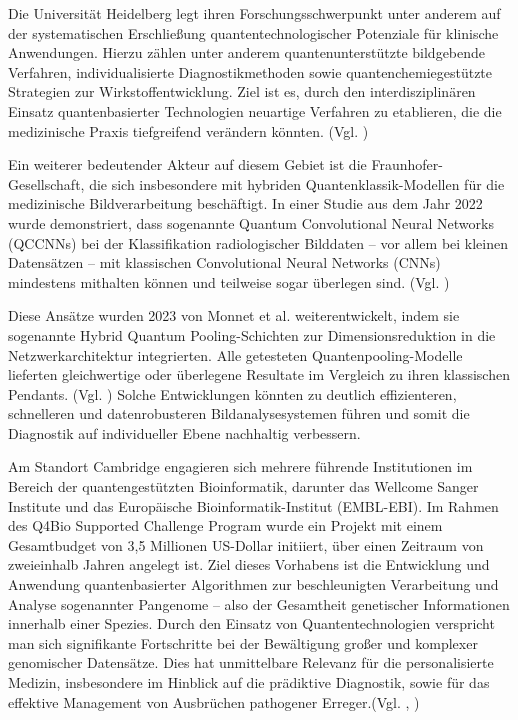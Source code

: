 Die Universität Heidelberg legt ihren Forschungsschwerpunkt unter anderem auf der systematischen Erschließung quantentechnologischer Potenziale für klinische Anwendungen. Hierzu zählen unter anderem quantenunterstützte bildgebende Verfahren, individualisierte Diagnostikmethoden sowie quantenchemiegestützte Strategien zur Wirkstoffentwicklung. Ziel ist es, durch den interdisziplinären Einsatz quantenbasierter Technologien neuartige Verfahren zu etablieren, die die medizinische Praxis tiefgreifend verändern könnten. (Vgl. \cite{noauthor_hgsfp_nodate})

Ein weiterer bedeutender Akteur auf diesem Gebiet ist die Fraunhofer-Gesellschaft, die sich insbesondere mit hybriden Quantenklassik-Modellen für die medizinische Bildverarbeitung beschäftigt. In einer Studie aus dem Jahr 2022 wurde demonstriert, dass sogenannte Quantum Convolutional Neural Networks (QCCNNs) bei der Klassifikation radiologischer Bilddaten – vor allem bei kleinen Datensätzen – mit klassischen Convolutional Neural Networks (CNNs) mindestens mithalten können und teilweise sogar überlegen sind. (Vgl. \cite{matic_quantum-classical_2022})

Diese Ansätze wurden 2023 von Monnet et al. weiterentwickelt, indem sie sogenannte Hybrid Quantum Pooling-Schichten zur Dimensionsreduktion in die Netzwerkarchitektur integrierten. Alle getesteten Quantenpooling-Modelle lieferten gleichwertige oder überlegene Resultate im Vergleich zu ihren klassischen Pendants. (Vgl. \cite{monnet_pooling_2023}) 
 Solche Entwicklungen könnten zu deutlich effizienteren, schnelleren und datenrobusteren Bildanalysesystemen führen und somit die Diagnostik auf individueller Ebene nachhaltig verbessern.

Am Standort Cambridge engagieren sich mehrere führende Institutionen im Bereich der quantengestützten Bioinformatik, darunter das Wellcome Sanger Institute und das Europäische Bioinformatik-Institut (EMBL-EBI). Im Rahmen des Q4Bio Supported Challenge Program wurde ein Projekt mit einem Gesamtbudget von 3,5 Millionen US-Dollar initiiert, über einen Zeitraum von zweieinhalb Jahren angelegt ist. Ziel dieses Vorhabens ist die Entwicklung und Anwendung quantenbasierter Algorithmen zur beschleunigten Verarbeitung und Analyse sogenannter Pangenome – also der Gesamtheit genetischer Informationen innerhalb einer Spezies. Durch den Einsatz von Quantentechnologien verspricht man sich signifikante Fortschritte bei der Bewältigung großer und komplexer genomischer Datensätze. Dies hat unmittelbare Relevanz für die personalisierte Medizin, insbesondere im Hinblick auf die prädiktive Diagnostik, sowie für das effektive Management von Ausbrüchen pathogener Erreger.(Vgl. \cite{apr_2024_researchers_nodate}, \cite{})%

